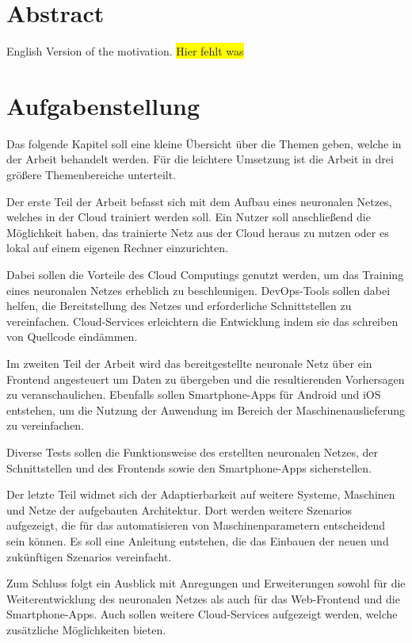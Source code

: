 \newpage

\section{Abstract}
English Version of the motivation.
\colorbox{yellow}{Hier fehlt was}

\newpage

\section{Aufgabenstellung}
\label{sec:aufgabenstellung}
Das folgende Kapitel soll eine kleine Übersicht über die Themen geben, welche in der Arbeit behandelt werden. Für die
leichtere Umsetzung ist die Arbeit in drei größere Themenbereiche unterteilt.

Der erste Teil der Arbeit befasst sich mit dem Aufbau eines neuronalen Netzes, welches in der Cloud trainiert werden
soll. Ein Nutzer soll anschließend die Möglichkeit haben, das trainierte Netz aus der Cloud heraus zu nutzen oder es
lokal auf einem eigenen Rechner einzurichten.

Dabei sollen die Vorteile des Cloud Computings genutzt werden, um das Training eines neuronalen Netzes erheblich zu
beschleunigen. DevOps-Tools sollen dabei helfen, die Bereitstellung des Netzes und erforderliche Schnittstellen zu
vereinfachen. Cloud-Services erleichtern die Entwicklung indem sie das schreiben von Quellcode eindämmen.

Im zweiten Teil der Arbeit wird das bereitgestellte neuronale Netz über ein Frontend angesteuert um Daten zu übergeben
und die resultierenden Vorhersagen zu veranschaulichen. Ebenfalls sollen Smartphone-Apps für Android und iOS entstehen,
um die Nutzung der Anwendung im Bereich der Maschinenauslieferung zu vereinfachen.

Diverse Tests sollen die Funktionsweise des erstellten neuronalen Netzes, der Schnittstellen und des Frontends
sowie den Smartphone-Apps sicherstellen.

Der letzte Teil widmet sich der Adaptierbarkeit auf weitere Systeme, Maschinen und Netze der aufgebauten Architektur.
Dort werden weitere Szenarios aufgezeigt, die für das automatisieren von Maschinenparametern entscheidend sein können.
Es soll eine Anleitung entstehen, die das Einbauen der neuen und zukünftigen Szenarios vereinfacht.

Zum Schluss folgt ein Ausblick mit Anregungen und Erweiterungen sowohl für die Weiterentwicklung des neuronalen Netzes
als auch für das Web-Frontend und die Smartphone-Apps. Auch sollen weitere Cloud-Services aufgezeigt werden, welche
zusätzliche Möglichkeiten bieten.

